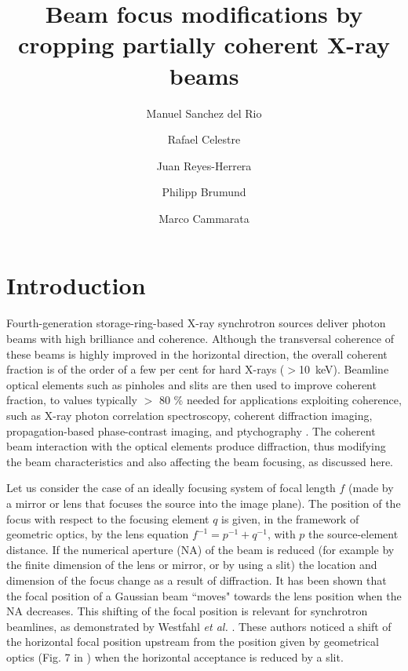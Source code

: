 \documentclass[9pt,twocolumn,twoside]{osajnl}
\title{Beam focus modifications by cropping partially coherent X-ray beams}
\author[1*]{Manuel Sanchez del Rio}
\author[1]{Rafael Celestre}
\author[1]{Juan Reyes-Herrera}
\author[1]{Philipp Brumund}
\author[1]{Marco Cammarata}
\affil[1]{European Synchrotron Radiation Facility, 71 Avenue des Martyrs, 38000 Grenoble}
\affil[*]{Corresponding author: srio@esrf.eu}
\begin{document}
\maketitle

\section{Introduction}
\label{sec:introduction}
Fourth-generation storage-ring-based X-ray synchrotron sources deliver photon beams with high brilliance and coherence. Although the transversal coherence of these beams is highly improved in the horizontal direction, 
the overall coherent fraction is of the order of a few per cent for hard X-rays ($>$10~keV). Beamline optical elements such as pinholes and slits are then used to improve coherent fraction, to values typically $>$ 80 \% needed for applications exploiting coherence, such as X-ray photon correlation spectroscopy, coherent diffraction imaging, propagation-based phase-contrast imaging, and ptychography \cite{paganin_book}. The coherent beam interaction with the optical elements produce diffraction, thus modifying the beam characteristics and also affecting the beam focusing, as discussed here.




Let us consider the case of an ideally focusing system of focal length $f$ (made by a mirror or lens that focuses the source into the image plane). The position of the focus with respect to the focusing element $q$ is given, in the framework of geometric optics, by the lens equation $f^{-1}=p^{-1}+q^{-1}$, with $p$ the source-element distance. If the numerical aperture (NA) of the beam is reduced (for example by the finite dimension of the lens or mirror, or by using a slit) the location and dimension of the focus change as a result of diffraction. It has been shown \cite{Tanaka:85} that the focal position of a Gaussian beam ``moves" towards the lens position when the NA decreases. This shifting of the focal position is relevant for synchrotron beamlines, as demonstrated by Westfahl {\it et al.} \cite{westfahl}. These authors noticed a shift of the horizontal focal position upstream from the position given by geometrical optics (Fig. 7 in \cite{westfahl}) when the horizontal acceptance is reduced by a slit. 
\end{document}
